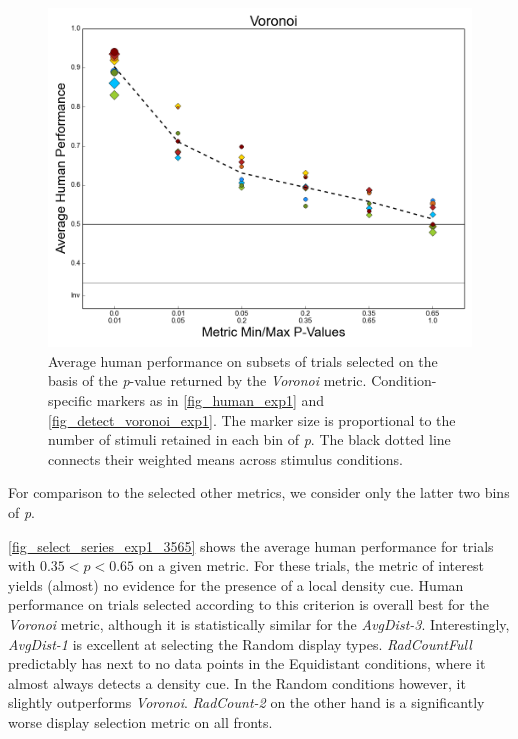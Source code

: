 \documentclass[12pt]{article}
\begin{document}
\begin{figure}
\includegraphics{Figures/FIG_select_Voronoi_exp1.png}
\caption{Average human performance on subsets of trials selected on the basis of the \emph{p}-value returned by the \emph{Voronoi} metric. Condition-specific markers as in \autoref{fig_human_exp1} and \autoref{fig_detect_voronoi_exp1}. The marker size is proportional to the number of stimuli retained in each bin of \emph{p}. The black dotted line connects their weighted means across stimulus conditions.}
\label{fig_select_voronoi_exp1}
\end{figure}

For comparison to the selected other metrics, we consider only the latter two bins of \emph{p}.

\autoref{fig_select_series_exp1_3565} shows the average human performance for trials with $0.35 < p < 0.65$ on a given metric. For these trials, the metric of interest yields (almost) no evidence for the presence of a local density cue. Human performance on trials selected according to this criterion is overall best for the \emph{Voronoi} metric, although it is statistically similar for the \emph{AvgDist-3}. Interestingly, \emph{AvgDist-1} is excellent at selecting the Random display types. \emph{RadCountFull} predictably has next to no data points in the Equidistant conditions, where it almost always detects a density cue. In the Random conditions however, it slightly outperforms \emph{Voronoi}. \emph{RadCount-2} on the other hand is a significantly worse display selection metric on all fronts.
\end{document}
